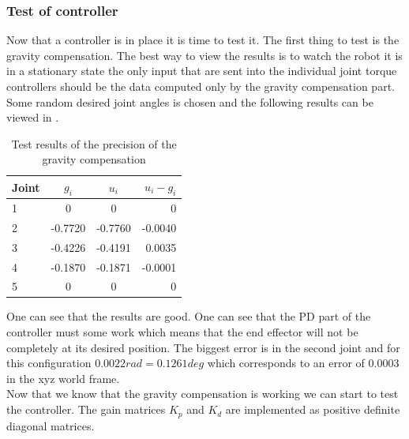 \subsubsection{Test of controller}
Now that a controller is in place it is time to test it. The first thing to test is the gravity compensation. The best way to view the results is to watch the robot it is in a stationary state the only input that are sent into the individual joint torque controllers should be the data computed only by the gravity compensation part. Some random desired joint angles is chosen and the following results can be viewed in .\\

\begin{table}[htbp]
\centering
\caption{Test results of the precision of the gravity compensation}
\label{table:gravity}
    \begin{tabular}{l c c r}
        \toprule
        Joint  &  $g_i$ & $u_i$ & $u_i-g_i$\\
        \midrule
        1 & 0 & 0 & 0\\
        2 & -0.7720  & -0.7760  & -0.0040 \\
        3 &-0.4226 & -0.4191 & 0.0035 \\
        4 & -0.1870 &-0.1871 & -0.0001\\
        5 & 0 & 0 & 0\\
        \bottomrule
    \end{tabular}
\end{table}

 One can see that the results are good. One can see that the PD part of the controller must some work which means that the end effector will not be completely at its desired position. The biggest error is in the second joint and for this configuration $0.0022 rad = 0.1261 deg$ which corresponds to an error of $0.0003$ in the xyz world frame. \\
 
Now that we know that the gravity compensation is working we can start to test the controller. The gain matrices $K_p$ and $K_d$ are implemented as positive definite diagonal matrices.

